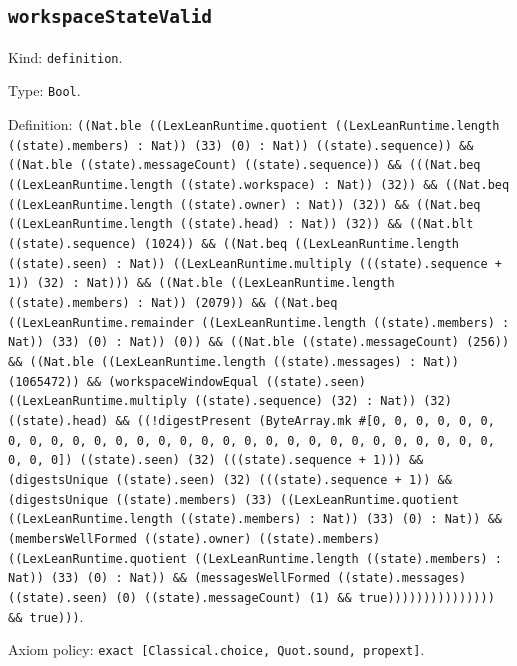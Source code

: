 \documentclass[11pt]{article}
\begin{document}
\subsection*{\texttt{workspaceStateValid}}
\noindent Kind: \texttt{definition}.\par
\noindent Type: \texttt{Bool}.\par
\noindent Definition: \texttt{((Nat.ble ((LexLeanRuntime.quotient ((LexLeanRuntime.length ((state).members) : Nat)) (33) (0) : Nat)) ((state).sequence)) \&\& ((Nat.ble ((state).messageCount) ((state).sequence)) \&\& (((Nat.beq ((LexLeanRuntime.length ((state).workspace) : Nat)) (32)) \&\& ((Nat.beq ((LexLeanRuntime.length ((state).owner) : Nat)) (32)) \&\& ((Nat.beq ((LexLeanRuntime.length ((state).head) : Nat)) (32)) \&\& ((Nat.blt ((state).sequence) (1024)) \&\& ((Nat.beq ((LexLeanRuntime.length ((state).seen) : Nat)) ((LexLeanRuntime.multiply (((state).sequence + 1)) (32) : Nat))) \&\& ((Nat.ble ((LexLeanRuntime.length ((state).members) : Nat)) (2079)) \&\& ((Nat.beq ((LexLeanRuntime.remainder ((LexLeanRuntime.length ((state).members) : Nat)) (33) (0) : Nat)) (0)) \&\& ((Nat.ble ((state).messageCount) (256)) \&\& ((Nat.ble ((LexLeanRuntime.length ((state).messages) : Nat)) (1065472)) \&\& (workspaceWindowEqual ((state).seen) ((LexLeanRuntime.multiply ((state).sequence) (32) : Nat)) (32) ((state).head) \&\& ((!digestPresent (ByteArray.mk \#[0, 0, 0, 0, 0, 0, 0, 0, 0, 0, 0, 0, 0, 0, 0, 0, 0, 0, 0, 0, 0, 0, 0, 0, 0, 0, 0, 0, 0, 0, 0, 0]) ((state).seen) (32) (((state).sequence + 1))) \&\& (digestsUnique ((state).seen) (32) (((state).sequence + 1)) \&\& (digestsUnique ((state).members) (33) ((LexLeanRuntime.quotient ((LexLeanRuntime.length ((state).members) : Nat)) (33) (0) : Nat)) \&\& (membersWellFormed ((state).owner) ((state).members) ((LexLeanRuntime.quotient ((LexLeanRuntime.length ((state).members) : Nat)) (33) (0) : Nat)) \&\& (messagesWellFormed ((state).messages) ((state).seen) (0) ((state).messageCount) (1) \&\& true))))))))))))))) \&\& true)))}.\par
\noindent Axiom policy: \texttt{exact [Classical.choice, Quot.sound, propext]}.\par
\end{document}
